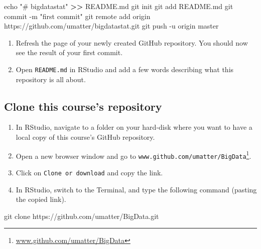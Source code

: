 \documentclass[
  12pt,
]{style/krantz}
\newenvironment{Shaded}{\begin{snugshade}}{\end{snugshade}}
\newcommand{\AttributeTok}[1]{\textcolor[rgb]{0.77,0.63,0.00}{#1}}
\newcommand{\BuiltInTok}[1]{#1}
\newcommand{\FunctionTok}[1]{\textcolor[rgb]{0.00,0.00,0.00}{#1}}
\newcommand{\NormalTok}[1]{#1}
\newcommand{\OperatorTok}[1]{\textcolor[rgb]{0.81,0.36,0.00}{\textbf{#1}}}
\newcommand{\StringTok}[1]{\textcolor[rgb]{0.31,0.60,0.02}{#1}}
\providecommand{\tightlist}{%
  \setlength{\itemsep}{0pt}\setlength{\parskip}{0pt}}
\renewcommand{\href}[2]{#2\footnote{\url{#1}}}
\begin{document}
\begin{Shaded}
\begin{Highlighting}[]
\BuiltInTok{echo} \StringTok{"\# bigdatastat"} \OperatorTok{\textgreater{}\textgreater{}}\NormalTok{ README.md}
\FunctionTok{git}\NormalTok{ init}
\FunctionTok{git}\NormalTok{ add README.md}
\FunctionTok{git}\NormalTok{ commit }\AttributeTok{{-}m} \StringTok{"first commit"}
\FunctionTok{git}\NormalTok{ remote add origin https://github.com/umatter/bigdatastat.git}
\FunctionTok{git}\NormalTok{ push }\AttributeTok{{-}u}\NormalTok{ origin master}
\end{Highlighting}
\end{Shaded}

\begin{enumerate}
\def\labelenumi{\arabic{enumi}.}
\setcounter{enumi}{4}
\tightlist
\item
  Refresh the page of your newly created GitHub repository. You should now see the result of your first commit.
\item
  Open \texttt{README.md} in RStudio and add a few words describing what this repository is all about.
\end{enumerate}

\hypertarget{clone-this-courses-repository}{%
\subsection{Clone this course's repository}\label{clone-this-courses-repository}}

\begin{enumerate}
\def\labelenumi{\arabic{enumi}.}
\tightlist
\item
  In RStudio, navigate to a folder on your hard-disk where you want to have a local copy of this course's GitHub repository.
\item
  Open a new browser window and go to \href{www.github.com/umatter/BigData}{\texttt{www.github.com/umatter/BigData}}.
\item
  Click on \texttt{Clone\ or\ download} and copy the link.
\item
  In RStudio, switch to the Terminal, and type the following command (pasting the copied link).
\end{enumerate}

\begin{Shaded}
\begin{Highlighting}[]
\FunctionTok{git}\NormalTok{ clone https://github.com/umatter/BigData.git}
\end{Highlighting}
\end{Shaded}
\end{document}
